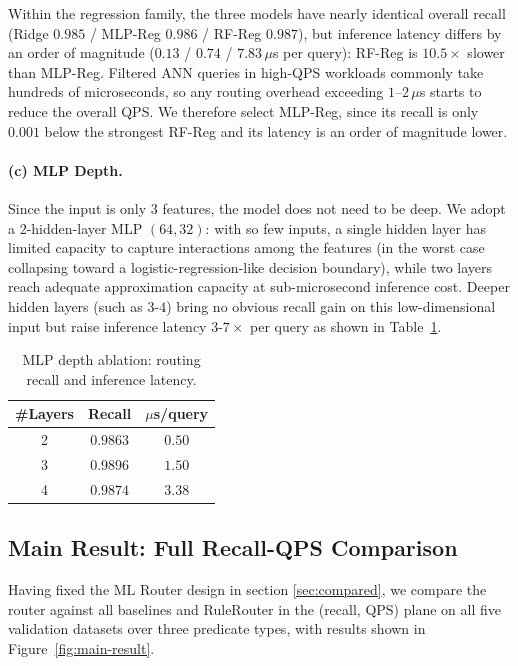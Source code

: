 Within the regression family, the three models have nearly identical overall recall (Ridge $0.985$ / MLP-Reg $0.986$ / RF-Reg $0.987$), but inference latency differs by an order of magnitude ($0.13$ / $0.74$ / $7.83\,\mu$s per query): RF-Reg is $10.5\times$ slower than MLP-Reg.
Filtered ANN queries in high-QPS workloads commonly take hundreds of microseconds, so any routing overhead exceeding $1$--$2\,\mu$s starts to reduce the overall QPS.
We therefore select MLP-Reg, since its recall is only $0.001$ below the strongest RF-Reg and its latency is an order of magnitude lower.



\paragraph{(c) MLP Depth.}
\label{sssec:mlp-depth}

Since the input is only $3$ features, the model does not need to be deep. We adopt a $2$-hidden-layer MLP $(64, 32)$: with so few inputs, a single hidden layer has limited capacity to capture interactions among the features (in the worst case collapsing toward a logistic-regression-like decision boundary), while two layers reach adequate approximation capacity at sub-microsecond inference cost. Deeper hidden layers (such as $3$-$4$) bring no obvious recall gain on this low-dimensional input but raise inference latency $3$-$7\times$ per query as shown in Table~\ref{tab:mlp-depth}.

\begin{table}[t]
  \centering
  \caption{MLP depth ablation: routing recall and inference latency.}
  \label{tab:mlp-depth}
  \begin{tabular}{ccc}
    \toprule
    \#Layers & Recall & $\mu$s/query \\
    \midrule
    2 & $0.9863$ & $0.50$ \\
    3 & $0.9896$ & $1.50$ \\
    4 & $0.9874$ & $3.38$ \\
    \bottomrule
  \end{tabular}
\end{table}

\subsection{Main Result: Full Recall-QPS Comparison}
\label{sec:main-result}

Having fixed the ML Router design in section \ref{sec:compared}, we compare the router against all baselines and RuleRouter in the (recall, QPS) plane on all five validation datasets over three predicate types, with results shown in Figure~\ref{fig:main-result}.


